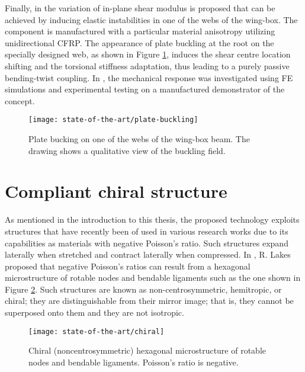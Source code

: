   Finally, in \cite{Runkel2016} the variation of in-plane shear modulus is proposed that can be achieved by inducing elastic instabilities in one of the webs of the wing-box. The component is manufactured with a particular material anisotropy utilizing unidirectional CFRP. The appearance of plate buckling at the root on the specially designed web, as shown in Figure \ref{fig:plate-buckling}, induces the shear centre location shifting and the torsional stiffness adaptation, thus leading to a purely passive bending-twist coupling. In \cite{Andreas2015}, the mechanical response was investigated using FE simulations and experimental testing on a manufactured demonstrator of the concept.

  \begin{figure}[!htpb]
    \centering
    \texttt{[image: state-of-the-art/plate-buckling]}
    \caption[Plate bucking on one of the webs of the wing-box beam]{Plate bucking on one of the webs of the wing-box beam. The drawing shows a qualitative view of the buckling field. \cite{Runkel2016}}\label{fig:plate-buckling}
  \end{figure}

\clearpage
\section{Compliant chiral structure} \label{sec:chiral_state}

  As mentioned in the introduction to this thesis, the proposed technology exploits structures that have recently been of used in various research works due to its capabilities as materials with negative Poisson's ratio. Such structures expand laterally when stretched and contract laterally when compressed. In \cite{Lakes1991}, R. Lakes proposed that negative Poisson's ratios can result from a hexagonal microstructure of rotable nodes and bendable ligaments such as the one shown in Figure \ref{fig:chiral}. Such structures are known as non-centrosymmetric, hemitropic, or chiral; they are distinguishable from their mirror image; that is, they cannot be superposed onto them and they are not isotropic.

  \begin{figure}[!htpb]
    \centering
    \texttt{[image: state-of-the-art/chiral]}
    \caption[Chiral structure of rotable nodes and bendable ligaments]{Chiral (noncentrosymmetric) hexagonal microstructure of rotable nodes and bendable ligaments. Poisson's ratio is negative. \cite{Lakes1991}}\label{fig:chiral}
  \end{figure}

